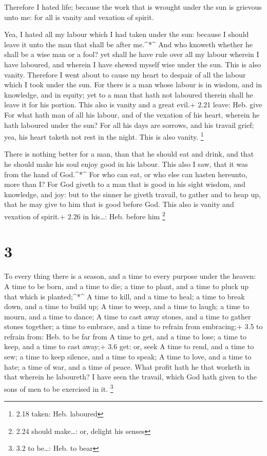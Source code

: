  Therefore I hated life; because the work that is wrought
under the sun is grievous unto me: for all is vanity and vexation of
spirit.

 Yea, I hated all my labour which I had taken under the
sun: because I should leave it unto the man that shall be after
me.\^{}*\^{}  And who knoweth whether he shall be a wise
man or a fool? yet shall he have rule over all my labour wherein I have
laboured, and wherein I have shewed myself wise under the sun. This is
also vanity.  Therefore I went about to cause my heart to
despair of all the labour which I took under the sun.  For
there is a man whose labour is in wisdom, and in knowledge, and in
equity; yet to a man that hath not laboured therein shall he leave it
for his portion. This also is vanity and a great evil.+ 2.21 leave: Heb.
give  For what hath man of all his labour, and of the
vexation of his heart, wherein he hath laboured under the sun?
 For all his days are sorrows, and his travail grief; yea,
his heart taketh not rest in the night. This is also vanity. \footnote{2.18
  taken: Heb. laboured}

 There is nothing better for a man, than that he should eat
and drink, and that he should make his soul enjoy good in his labour.
This also I saw, that it was from the hand of God.\^{}*\^{}
 For who can eat, or who else can hasten hereunto, more
than I?  For God giveth to a man that is good in his sight
wisdom, and knowledge, and joy: but to the sinner he giveth travail, to
gather and to heap up, that he may give to him that is good before God.
This also is vanity and vexation of spirit.+ 2.26 in his\ldots: Heb.
before him \footnote{2.24 should make\ldots: or, delight his senses}

\hypertarget{section-2}{%
\section{3}\label{section-2}}

 To every thing there is a season, and a time to every
purpose under the heaven:  A time to be born, and a time to
die; a time to plant, and a time to pluck up that which is
planted;\^{}*\^{}  A time to kill, and a time to heal; a
time to break down, and a time to build up;  A time to weep,
and a time to laugh; a time to mourn, and a time to dance; 
A time to cast away stones, and a time to gather stones together; a time
to embrace, and a time to refrain from embracing;+ 3.5 to refrain from:
Heb. to be far from  A time to get, and a time to lose; a
time to keep, and a time to cast away;+ 3.6 get: or, seek  A
time to rend, and a time to sew; a time to keep silence, and a time to
speak;  A time to love, and a time to hate; a time of war,
and a time of peace.  What profit hath he that worketh in
that wherein he laboureth?  I have seen the travail, which
God hath given to the sons of men to be exercised in it. \footnote{3.2
  to be\ldots: Heb. to bear}


